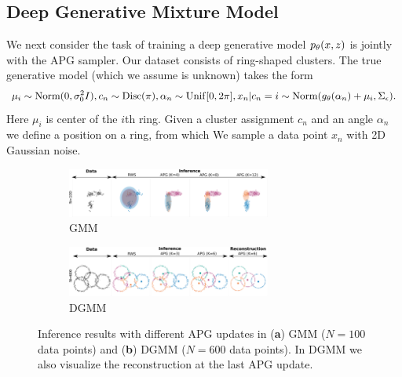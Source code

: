 \documentclass[anonymous=false, %
               format=acmsmall, %
               review=true, %
               screen=true, %
               nonacm=true]{acmart}
\theoremstyle{definition}
\begin{document}
\subsection{Deep Generative Mixture Model}
We next consider the task of training a deep generative model $p_\theta(x, z)$ is jointly with the APG sampler. Our dataset consists of ring-shaped clusters. The true generative model (which we assume is unknown) takes the form
\begin{align*}
    \mu_i \sim \text{Norm}(0, 
    \sigma_0^2 I)
    ,
    c_n \sim \mathrm{Disc}(\pi)
    , 
    \alpha_n \sim \mathrm{Unif}[0, 2\pi]
    ,
    x_n | c_n=i \sim \text{Norm}(g_\theta(\alpha_n) + \mu_i, \Sigma_\epsilon).
\end{align*}
Here $\mu_i$ is center of the $i$th ring. Given a cluster assignment $c_n$ and an angle $\alpha_n$ we define a position on a ring, from which We sample a data point $x_n$ with 2D Gaussian noise.
\begin{figure}[t!]
  \centering
  \begin{subfigure}[t]{0.5\textwidth}
  \includegraphics[width=67mm]{figures/gmm_samples_1dataset.pdf}
  \vspace*{-1mm}
  \caption{GMM}
  \label{samples-gmm}
  \vspace{-1ex}
  \end{subfigure}%
  \begin{subfigure}[t]{0.5\textwidth}
  \includegraphics[width=67mm]{figures/dgmm_samples_1dataset.pdf}
  \vspace*{-1mm}
  \caption{DGMM}
  \label{samples-dgmm}
  \vspace{-1ex}
  \end{subfigure}
  \caption{Inference results with different APG updates in (\textbf{a}) GMM ($N=100$ data points) and (\textbf{b}) DGMM ($N=600$ data points). In DGMM we also visualize the reconstruction at the last APG update.}
  \label{samples-mixture}
\end{figure}
\end{document}
